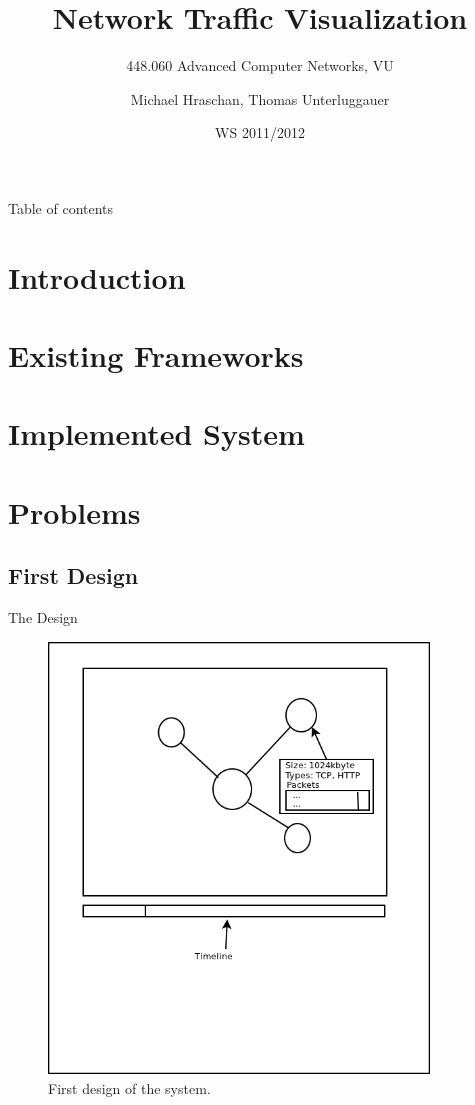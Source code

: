 \documentclass{beamer}
\title
{Network Traffic Visualization}
\subtitle
{448.060 Advanced Computer Networks, VU}
\author
{Michael Hraschan, Thomas Unterluggauer}
\date
{WS 2011/2012}
\begin{document}
\lstset{language=XML,tabsize=2,basicstyle=\footnotesize,breaklines=true}

\begin{frame}
	\titlepage
\end{frame}

\begin{frame}{Table of contents}
	\tableofcontents
\end{frame}

\section{Introduction}

\section{Existing Frameworks}

\section{Implemented System}

\section{Problems}

\subsection{First Design}

\begin{frame}{The Design}
 \begin{figure}
 \centering
 \includegraphics[width=0.9\textwidth]{./img/draft1.png}
 \caption{First design of the system.}
 \label{fig:draft1}
\end{figure}
\end{frame}
\end{document}
